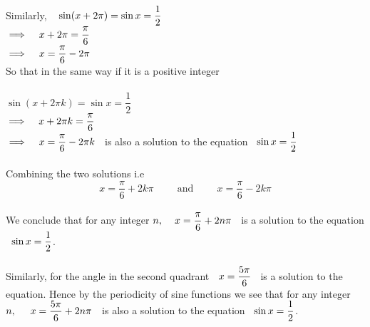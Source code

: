 \documentclass[11pt,a4paper]{article}
\begin{document}
Similarly, $\hspace{0.3cm} \sin ( x + 2\pi) = \sin x = \dfrac{1}{2}$\\

$\implies\hspace{0.3cm} x + 2\pi  = \dfrac{\pi}{6}$\\

$\implies \hspace{0.3cm} x = \dfrac{\pi}{6}- 2\pi$\\

So that in the same way if it is a positive integer\\\\





$\sin ( x + 2\pi k ) = \sin x = \dfrac{1}{2}$\\


$\implies \hspace{0.3cm} x + 2\pi k = \dfrac{\pi}{6}$\\

$\implies \hspace{0.3cm} x = \dfrac{\pi}{6} - 2\pi k\hspace{0.2cm}$ is also a solution to the equation $\hspace{0.2cm} \sin x = \dfrac{1}{2}$\\\\




Combining the two solutions i.e $$x = \dfrac{\pi}{6} + 2k\pi \hspace{1cm} \text{and}\hspace{1cm}    x = \dfrac{\pi}{6} - 2k\pi$$\\



We conclude that for any integer $n,\hspace{0.4cm} x = \dfrac{\pi}{6} + 2n\pi\hspace{0.2cm}$ is a solution to the equation $\hspace{0.2cm} \sin x = \dfrac{1}{2}$.\\\\



Similarly, for the angle in the second quadrant $\hspace{0.2cm} x = \dfrac{5\pi}{6}\hspace{0.2cm}$ is a solution to the equation. Hence by the periodicity of sine functions we see that for any integer $n,\hspace{0.5cm} x = \dfrac{5\pi}{6} + 2n\pi\hspace{0.2cm}$ is also a solution to the equation $\hspace{0.2cm} \sin x = \dfrac{1}{2}$.\\\\
\end{document}
